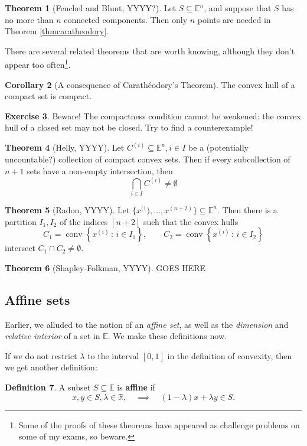 \documentclass[11pt]{article}
\numberwithin{equation}{section}
\theoremstyle{definition}
\newtheorem{theorem}{Theorem}[section]
\newtheorem{exercise}[theorem]{Exercise}
\newtheorem{corollary}[theorem]{Corollary}
\newtheorem{definition}[theorem]{Definition}%
\newcommand{\bE}{\mathbb{E}}
\newcommand{\bR}{\mathbb{R}}
\newcommand{\set}[2]{\left\{#1\,:\,#2\right\}}
\newcommand{\conv}{\operatorname{conv}}
\begin{document}
\begin{theorem}[Fenchel and Blunt, YYYY?]
    Let $S\subseteq\bE^n$, and suppose that $S$ has no more than $n$ connected components. Then only $n$ points are needed in Theorem \ref{thmcaratheodory}.
\end{theorem}
There are several related theorems that are worth knowing, although they don't appear too often\footnote{Some of the proofs of these theorems have appeared as challenge problems on some of my exams, so beware.}.
\begin{corollary}[A consequence of Carath\'eodory's Theorem]
    The convex hull of a compact set is compact.
\end{corollary}
\begin{exercise}
    Beware! The compactness condition cannot be weakened: the convex hull of a closed set may not be closed. Try to find a counterexample!
\end{exercise}
\begin{theorem}[Helly, YYYY]
    Let $C^{(i)}\subseteq \bE^n, i\in I$ be a (potentially uncountable?) collection of compact convex sets. Then if every subcollection of $n+1$ sets have a non-empty intersection, then
    \begin{equation}
        \bigcap_{i\in I} C^{(i)}\neq \emptyset
    \end{equation}
\end{theorem}
\begin{theorem}[Radon, YYYY]
    Let $\{x^{(1}), ..., x^{(n+2)}\}\subseteq\bE^n$. Then there is a partition $I_1, I_2$ of the indices $[n+2]$ such that the convex hulls
    \begin{equation}
    C_1=\conv\set{x^{(i)}}{i\in I_1},\qquad C_2=\conv\set{x^{(i)}}{i\in I_2}
    \end{equation}
    intersect $C_1\cap C_2\neq\emptyset$.
\end{theorem}
\begin{theorem}[Shapley-Folkman, YYYY]
    GOES HERE
\end{theorem}
\subsection{Affine sets}
Earlier, we alluded to the notion of an \textit{affine set}, as well as the \textit{dimension} and \textit{relative interior} of a set in $\bE$. We make these definitions now.

If we do not restrict $\lambda$ to the interval $[0,1]$ in the definition of convexity, then we get another definition:
\begin{definition}
    \label{defaffine}%
    A subset $S\subseteq\bE$ is \textbf{affine} if
    \begin{equation} \label{defaffineeq}%
    x, y\in S, \lambda\in\bR,\quad\implies\quad (1-\lambda)x+\lambda y\in S.\end{equation}
\end{definition}
\end{document}
